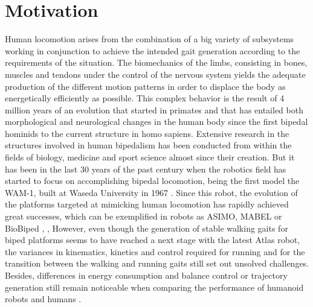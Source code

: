 \section{Motivation}
\label{sec:motivation}
Human locomotion arises from the combination of a big variety of subsystems working in conjunction to achieve the intended gait generation according to the requirements of the situation.
The biomechanics of the limbs, consisting in bones, muscles and tendons under the control of the nervous system yields the adequate production of the different motion patterns in order to displace the body as energetically efficiently as possible.
This complex behavior is the result of 4 million years of an evolution \cite{bipedalism} that started in primates and that has entailed both morphological and neurological changes in the human body since the first bipedal hominids to the current structure in homo sapiens. 
Extensive research in the structures involved in human bipedalism has been conducted from within the fields of biology, medicine and sport science almost since their creation. 
But it has been in the last 30 years of the past century when the robotics field has started to focus on accomplishing bipedal locomotion, being the first model the WAM-1, built at Waseda University in 1967 \cite{}.
Since this robot, the evolution of the platforms targeted at mimicking human locomotion has rapidly achieved great successes, which can be exemplified in robots as ASIMO, MABEL or BioBiped \cite{mabel}, \cite{biobiped}, %
However, even though the generation of stable walking gaits for biped platforms seems to have reached a next stage with the latest Atlas robot, the variances in kinematics, kinetics and control required for running and for the transition between the walking and running gaits still set out unsolved challenges.
Besides, differences in energy consumption and balance control or trajectory generation still remain noticeable when comparing the performance of humanoid robots and humans \cite{h7}.

